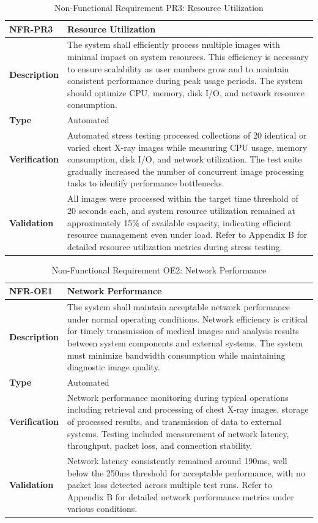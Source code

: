 \documentclass[12pt, titlepage]{article}
\begin{document}
\begin{table}[h!]
\centering
{}
\begin{tabular}{|p{3.5cm}|p{11.5cm}|}
\hline
\rowcolor{gray!30}
\textbf{NFR-PR3} & \textbf{Resource Utilization} \\
\hline
\textbf{Description} & The system shall efficiently process multiple images with minimal impact on system resources. This efficiency is necessary to ensure scalability as user numbers grow and to maintain consistent performance during peak usage periods. The system should optimize CPU, memory, disk I/O, and network resource consumption. \\
\hline
\textbf{Type} & Automated \\
\hline
\textbf{Verification} & Automated stress testing processed collections of 20 identical or varied chest X-ray images while measuring CPU usage, memory consumption, disk I/O, and network utilization. The test suite gradually increased the number of concurrent image processing tasks to identify performance bottlenecks. \\
\hline
\textbf{Validation} & All images were processed within the target time threshold of 20 seconds each, and system resource utilization remained at approximately 15\% of available capacity, indicating efficient resource management even under load. Refer to Appendix B for detailed resource utilization metrics during stress testing. \\
\hline
\end{tabular}
\caption{Non-Functional Requirement PR3: Resource Utilization}
\end{table}

\begin{table}[h!]
\centering
{}
\begin{tabular}{|p{3.5cm}|p{11.5cm}|}
\hline
\rowcolor{gray!30}
\textbf{NFR-OE1} & \textbf{Network Performance} \\
\hline
\textbf{Description} & The system shall maintain acceptable network performance under normal operating conditions. Network efficiency is critical for timely transmission of medical images and analysis results between system components and external systems. The system must minimize bandwidth consumption while maintaining diagnostic image quality. \\
\hline
\textbf{Type} & Automated \\
\hline
\textbf{Verification} & Network performance monitoring during typical operations including retrieval and processing of chest X-ray images, storage of processed results, and transmission of data to external systems. Testing included measurement of network latency, throughput, packet loss, and connection stability. \\
\hline
\textbf{Validation} & Network latency consistently remained around 190ms, well below the 250ms threshold for acceptable performance, with no packet loss detected across multiple test runs. Refer to Appendix B for detailed network performance metrics under various conditions. \\
\hline
\end{tabular}
\caption{Non-Functional Requirement OE2: Network Performance}
\end{table}
\end{document}
